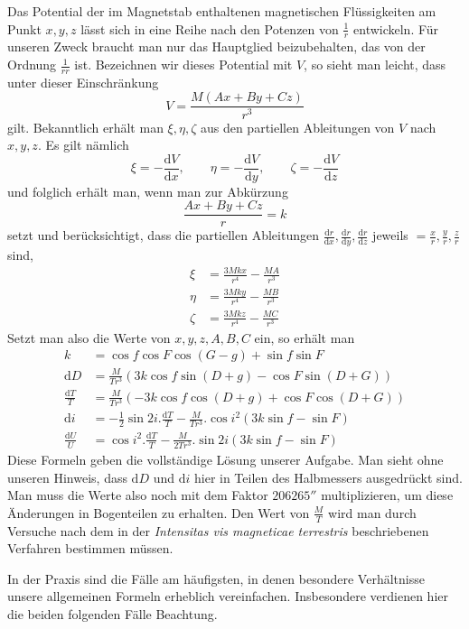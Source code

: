 Das Potential der im Magnetstab enthaltenen magnetischen Flüssigkeiten am Punkt $x,y,z$ lässt sich in eine Reihe nach den Potenzen von $\frac1r$ entwickeln. Für unseren Zweck braucht man nur das Hauptglied beizubehalten, das von der Ordnung $\frac{1}{rr}$ ist. Bezeichnen wir dieses Potential mit $V$, so sieht man leicht, dass unter dieser Einschränkung
\[
V=\frac{M(Ax+By+Cz)}{r^3}
\]
gilt. Bekanntlich erhält man $\xi,\eta,\zeta$ aus den partiellen Ableitungen von $V$ nach $x,y,z$. Es gilt nämlich
\[
\xi=-\frac{\mathrm{d}V}{\mathrm{d}x},\qquad\eta=-\frac{\mathrm{d}V}{\mathrm{d}y},\qquad\zeta=-\frac{\mathrm{d}V}{\mathrm{d}z}
\]
und folglich erhält man, wenn man zur Abkürzung
\[
\frac{Ax+By+Cz}{r}=k
\]
setzt und berücksichtigt, dass die partiellen Ableitungen $\frac{\mathrm{d}r}{\mathrm{d}x},\frac{\mathrm{d}r}{\mathrm{d}y},\frac{\mathrm{d}r}{\mathrm{d}z}$ jeweils $=\frac{x}{r},\frac{y}{r},\frac{z}{r}$ sind,
\[
\begin{aligned}
\xi&=\frac{3Mkx}{r^4}-\frac{MA}{r^3}\\
\eta&=\frac{3Mky}{r^4}-\frac{MB}{r^3}\\
\zeta&=\frac{3Mkz}{r^4}-\frac{MC}{r^3}
\end{aligned}
\]
Setzt man also die Werte von $x,y,z,A,B,C$ ein, so erhält man
\[
\begin{aligned}
k&=\cos f\cos F\cos(G-g)+\sin f\sin F\\
\mathrm{d}D&=\frac{M}{Tr^3}(3k\cos f\sin(D+g)-\cos F\sin(D+G))\\
\frac{\mathrm{d}T}{T}&=\frac{M}{Tr^3}(-3k\cos f\cos(D+g)+\cos F\cos(D+G))\\
\mathrm{d}i&=-\tfrac12\sin2i.\frac{\mathrm{d}T}{T}-\frac{M}{Tr^3}.\cos i^2(3k\sin f-\sin F)\\
\frac{\mathrm{d}U}{U}&=\cos i^2.\frac{\mathrm{d}T}{T}-\frac{M}{2Tr^3}.\sin2i(3k\sin f-\sin F)
\end{aligned}
\]
Diese Formeln geben die vollständige Lösung unserer Aufgabe. Man sieht ohne unseren Hinweis, dass $\mathrm{d}D$ und $\mathrm{d}i$ hier in Teilen des Halbmessers ausgedrückt sind. Man muss die Werte also noch mit dem Faktor $206265''$ multiplizieren, um diese Änderungen in Bogenteilen zu erhalten. Den Wert von $\frac{M}{T}$ wird man durch Versuche nach dem in der \textit{Intensitas vis magneticae terrestris} beschriebenen Verfahren bestimmen müssen.

In der Praxis sind die Fälle am häufigsten, in denen besondere Verhältnisse unsere allgemeinen Formeln erheblich vereinfachen. Insbesondere verdienen hier die beiden folgenden Fälle Beachtung.

